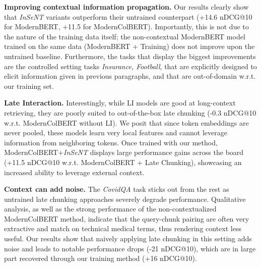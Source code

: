 


\noindent\textbf{Improving contextual information propagation.} Our results clearly show that \emph{InSeNT} variants outperform their untrained counterpart (+14.6 nDCG@10 for ModernBERT, +11.5 for ModernColBERT). Importantly, this is not due to the nature of the training data itself; the non-contextual ModernBERT model trained on the same data (ModernBERT + Training) does not improve upon the untrained baseline. Furthermore, the tasks that display the biggest improvements are the controlled setting tasks \textit{Insurance, Football}, that are explicitly designed to elicit information given in previous paragraphs, and that are out-of-domain w.r.t. our training set. 


\noindent\textbf{Late Interaction.} Interestingly, while LI models are good at long-context retrieving, they are poorly suited to out-of-the-box late chunking (-0.3 nDCG@10 w.r.t. ModernColBERT without LI). We posit that since token embeddings are never pooled, these models learn very local features and cannot leverage information from neighboring tokens. Once trained with our method, ModernColBERT+\emph{InSeNT} displays large performance gains across the board (+11.5 nDCG@10 w.r.t. ModernColBERT + Late Chunking), showcasing an increased ability to leverage external context.


\noindent\textbf{Context can add noise.} The \emph{CovidQA} task sticks out from the rest as untrained late chunking approaches severely degrade performance. Qualitative analysis, as well as the strong performance of the non-contextualized ModernColBERT method, indicate that the query-chunk pairing are often very extractive and match on technical medical terms, thus rendering context less useful. Our results show that naively applying late chunking in this setting adds noise and leads to notable performance drops (-21 nDCG@10), which are in large part recovered through our training method (+16 nDCG@10). 

